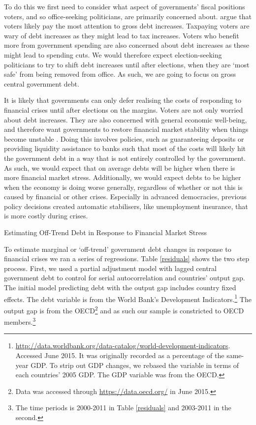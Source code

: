 \documentclass[]{article}
\begin{document}
To do this we first need to consider what aspect of governments' fiscal positions voters, and so office-seeking politicians, are primarily concerned about. \cite{gandrudHallerbergWEP} argue that voters likely pay the most attention to gross debt increases. Taxpaying voters are wary of debt increases as they might lead to tax increases. Voters who benefit more from government spending are also concerned about debt increases as these might lead to spending cuts. We would therefore expect election-seeking politicians to try to shift debt increases until after elections, when they are `most safe' from being removed from office. As such, we are going to focus on gross central government debt.

It is likely that governments can only defer realising the costs of responding to financial crises until after elections on the margins. Voters are not only worried about debt increases. They are also concerned with general economic well-being, and therefore want governments to restore financial market stability when things become unstable \citep{Rosas2009}. Doing this involves policies, such as guaranteeing deposits or providing liquidity assistance to banks such that most of the costs will likely hit the government debt in a way that is not entirely controlled by the government. As such, we would expect that on average debts will be higher when there is more financial market stress. Additionally, we would expect debts to be higher when the economy is doing worse generally, regardless of whether or not this is caused by financial or other crises. Especially in advanced democracies, previous policy decisions created automatic stabilisers, like unemployment insurance, that is more costly during crises.

\begin{table}
    \caption{Estimating Off-Trend Debt in Response to Financial Market Stress}
    \label{residuals}
        \begin{center}
            
        \end{center}
\end{table}

To estimate marginal or `off-trend' government debt changes in response to financial crises we ran a series of regressions. Table \ref{residuals} shows the two step process. First, we used a partial adjustment model with lagged central government debt to control for serial autocorrelation and countries' output gap. The initial model predicting debt with the output gap includes country fixed effects. The debt variable is from the World Bank's Development Indicators.\footnote{\url{http://data.worldbank.org/data-catalog/world-development-indicators}. Accessed June 2015. It was originally recorded as a percentage of the same-year GDP. To strip out GDP changes, we rebased
the variable in terms of each countries' 2005 GDP. The GDP variable was from the OECD.} The output gap is from the OECD\footnote{Data was accessed through \url{https://data.oecd.org/} in June 2015.} and as such our sample is constricted to OECD members.\footnote{The time periods is 2000-2011 in Table \ref{residuals} and 2003-2011 in the second.}
\end{document}
